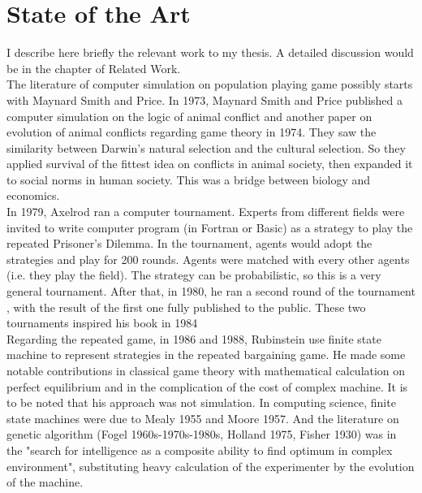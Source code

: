 \documentclass[12.5pt]{report}
\begin{document}
\chapter{State of the Art}

I describe here briefly the relevant work to my thesis. A detailed discussion would be in the chapter of Related Work.\\

The literature of computer simulation on population playing game possibly starts with Maynard Smith and Price. In 1973, Maynard Smith and Price published a computer simulation on the logic of animal conflict \cite{maynard2} and another paper on evolution of animal conflicts regarding game theory in 1974. They saw the similarity between Darwin's natural selection and the cultural selection. So they applied survival of the fittest idea on conflicts in animal society, then expanded it to social norms in human society. This was a bridge between biology and economics.\\

In 1979, Axelrod \cite{axel1} ran a computer tournament. Experts from different fields were invited to write computer program (in Fortran or Basic) as a strategy to play the repeated Prisoner's Dilemma. In the tournament, agents would adopt the strategies and play for 200 rounds. Agents were matched with every other agents (i.e. they play the field). The strategy can be probabilistic, so this is a very general tournament. After that, in 1980, he ran a second round of the tournament \cite{axel2}, with the result of the first one fully published to the public. These two tournaments inspired his book in 1984 \cite{axel3}\\

Regarding the repeated game, in 1986 and 1988, Rubinstein use finite state machine to represent strategies in the repeated bargaining game. He made some notable contributions in classical game theory with mathematical calculation on perfect equilibrium and in the complication of the cost of complex machine. It is to be noted that his approach was not simulation. In computing science, finite state machines were due to Mealy 1955 and Moore 1957. And the literature on genetic algorithm (Fogel 1960s-1970s-1980s, Holland 1975, Fisher 1930) was in the "search for intelligence as a composite ability to find optimum in complex environment", substituting heavy calculation of the experimenter by the evolution of the machine.\\
\end{document}
